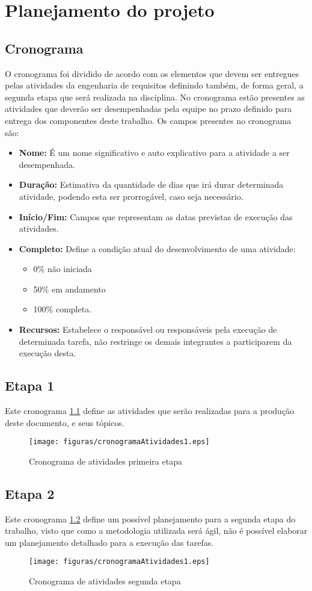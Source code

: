 \chapter[Planejamento do projet]{Planejamento do projeto}
\section{Cronograma}
O cronograma foi dividido de acordo com os elementos que devem ser entregues pelas atividades da engenharia de requisitos definindo também, de forma geral, a segunda etapa que será realizada na disciplina. No cronograma estão presentes as atividades que deverão ser desempenhadas pela equipe no prazo definido para entrega dos componentes deste trabalho.
Os campos presentes no cronograma são:
\begin{itemize}
\item \textbf{Nome:} É um nome significativo e auto explicativo para a atividade a ser desempenhada. 
\item \textbf{Duração:} Estimativa da quantidade de dias que irá durar determinada atividade, podendo esta ser prorrogável, caso seja necessário.
\item \textbf{Início/Fim:} Campos que representam as datas previstas de execução das atividades.
\item \textbf{Completo:} Define a condição atual do desenvolvimento de uma atividade:
    \begin{itemize}
        \item 0\% não iniciada
        \item  50\% em andamento
        \item 100\% completa.
    \end{itemize}
\item \textbf{Recursos:} Estabelece o responsável ou responsáveis pela execução de determinada tarefa, não restringe os demais integrantes a participarem da execução desta.
\end{itemize}
\section{Etapa 1}
Este cronograma \ref{cronograma1} define as atividades que serão realizadas para a produção deste documento, e seus tópicos.
\begin{figure}[H]
    \centering
    \label{cronograma1}
    \texttt{[image: figuras/cronogramaAtividades1.eps]}
    \caption{Cronograma de atividades primeira etapa}
\end{figure}
\section{Etapa 2}
Este cronograma \ref{cronograma2} define um possível planejamento para a segunda etapa do trabalho, visto que como a metodologia utilizada será ágil, não é possível elaborar um planejamento detalhado para a execução das tarefas.
\begin{figure}[H]
    \centering
    \label{cronograma2}
    \texttt{[image: figuras/cronogramaAtividades1.eps]}
    \caption{Cronograma de atividades segunda etapa}
\end{figure}


